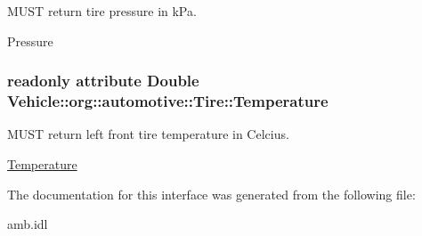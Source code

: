 M\-U\-S\-T return tire pressure in k\-Pa. 

Pressure \hypertarget{interfaceVehicle_1_1org_1_1automotive_1_1Tire_a869c96c8f2d1d472dba467f1ff8193b5}{
\subsubsection[{Temperature}]{\setlength{\rightskip}{0pt plus 5cm}readonly attribute Double Vehicle\-::org\-::automotive\-::\-Tire\-::\-Temperature}}\label{interfaceVehicle_1_1org_1_1automotive_1_1Tire_a869c96c8f2d1d472dba467f1ff8193b5}


M\-U\-S\-T return left front tire temperature in Celcius. 

\hyperlink{interfaceVehicle_1_1org_1_1automotive_1_1Temperature}{Temperature} 

The documentation for this interface was generated from the following file\-:\begin{DoxyCompactItemize}
\item 
amb.\-idl\end{DoxyCompactItemize}
